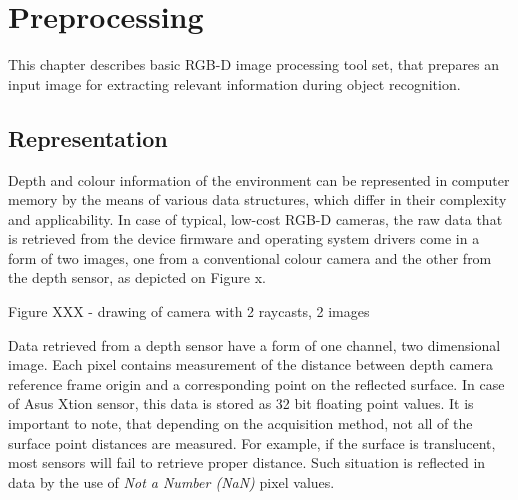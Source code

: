 \chapter{Preprocessing}
\label{cha:preprocessing}

This chapter describes basic RGB-D image processing tool set, that prepares an input image for extracting relevant information during object recognition.


\section{Representation}
\label{sec:representation}



Depth and colour information of the environment can be represented in computer memory by the means of various data structures, which differ in their complexity and applicability. In case of typical, low-cost RGB-D cameras, the raw data that is retrieved from the device firmware and operating system drivers come in a form of two images, one from a conventional colour camera and the other from the depth sensor, as depicted on Figure x.

Figure XXX - drawing of camera with 2 raycasts, 2 images

Data retrieved from a depth sensor have a form of one channel, two dimensional image. Each pixel contains measurement of the distance between depth camera reference frame origin and a corresponding point on the reflected surface. In case of Asus Xtion sensor, this data is stored as 32 bit floating point values. It is important to note, that depending on the acquisition method, not all of the surface point distances are measured. For example, if the surface is translucent, most sensors will fail to retrieve proper distance. Such situation is reflected in data by the use of \textit{Not a Number (NaN)} pixel values.

